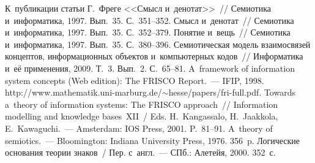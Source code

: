 {\begin{multicols}{2}
{{\begin{thebibliography}{99}
 К~публикации статьи Г.~Фреге <<Смысл и~денотат>>~// 
Семиотика и~информатика, 1997. Вып.~35. 
С.~351--352.
 Смысл и~денотат~// Семиотика и~информатика, 1997. Вып.~35. С.~352--379.
 Понятие и~вещь~// Семиотика и~информатика, 1997. Вып.~35. С.~380--396.
 Семиотическая модель взаимосвязей концептов, информационных 
объектов и~компьютерных кодов~// Информатика и~её применения, 2009. Т.~3. Вып.~2. 
С.~65--81.
A~framework of information system concepts (Web edition): The FRISCO Report.~--- IFIP, 
1998. {\sf http://www.mathematik.uni-marburg.de/$\sim$hesse/\linebreak papers/fri-full.pdf}.
 Towards a~theory of information systems: The FRISCO 
approach~// Information modelling and knowledge bases~XII~/ Eds. H.~Kangassalo, 
H.~Jaakkola, E.~Kawaguchi.~--- Amsterdam: IOS Press, 2001. P.~81--91.
 A~theory of semiotics.~--- Bloomington: Indiana University Press, 1976. 356~p.
 Логические основания теории знаков~/
Пер. с~англ.~---  СПб.: Алетейя, 2000. 352~с.


\end{thebibliography}}}
\end{multicols}}
